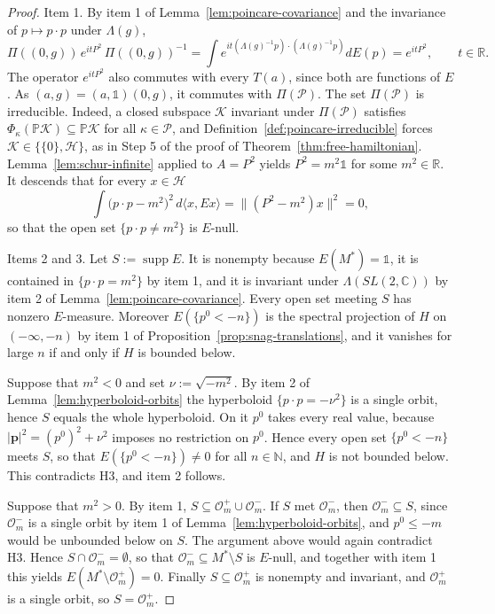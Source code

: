 \begin{proof}
	Item 1. By item 1 of Lemma~\ref{lem:poincare-covariance} and the invariance of $p\mapsto p\cdot p$ under $\Lambda(g)$,
	\begin{equation*}
		\Pi((0,g))\,e^{itP^2}\,\Pi((0,g))^{-1}=\int e^{it(\Lambda(g)^{-1}p)\cdot(\Lambda(g)^{-1}p)}dE(p)=e^{itP^2}, \qquad t\in\mathbb{R}.
	\end{equation*}
	The operator $e^{itP^2}$ also commutes with every $T(a)$, since both are functions of $E$. As $(a,g)=(a,\mathbb{1})(0,g)$, it commutes with $\Pi(\mathcal{P})$. The set $\Pi(\mathcal{P})$ is irreducible. Indeed, a closed subspace $\mathcal{K}$ invariant under $\Pi(\mathcal{P})$ satisfies $\Phi_\kappa(\mathbb{P}\mathcal{K})\subseteq\mathbb{P}\mathcal{K}$ for all $\kappa\in\mathcal{P}$, and Definition~\ref{def:poincare-irreducible} forces $\mathcal{K}\in\{\{0\},\mathcal{H}\}$, as in Step 5 of the proof of Theorem~\ref{thm:free-hamiltonian}. Lemma~\ref{lem:schur-infinite} applied to $A=P^2$ yields $P^2=m^2\mathbb{1}$ for some $m^2\in\mathbb{R}$. It descends that for every $x\in\mathcal{H}$
	\begin{equation*}
		\int\big(p\cdot p-m^2\big)^2\,d\langle x,Ex\rangle=\big\|(P^2-m^2)x\big\|^2=0,
	\end{equation*}
	so that the open set $\{p\cdot p\neq m^2\}$ is $E$-null.
	
	Items 2 and 3. Let $S:=\operatorname{supp}E$. It is nonempty because $E(M^*)=\mathbb{1}$, it is contained in $\{p\cdot p=m^2\}$ by item 1, and it is invariant under $\Lambda(SL(2,\mathbb{C}))$ by item 2 of Lemma~\ref{lem:poincare-covariance}. Every open set meeting $S$ has nonzero $E$-measure. Moreover $E(\{p^0<-n\})$ is the spectral projection of $H$ on $(-\infty,-n)$ by item 1 of Proposition~\ref{prop:snag-translations}, and it vanishes for large $n$ if and only if $H$ is bounded below.
	
	Suppose that $m^2<0$ and set $\nu:=\sqrt{-m^2}$. By item 2 of Lemma~\ref{lem:hyperboloid-orbits} the hyperboloid $\{p\cdot p=-\nu^2\}$ is a single orbit, hence $S$ equals the whole hyperboloid. On it $p^0$ takes every real value, because $|\mathbf{p}|^2=(p^0)^2+\nu^2$ imposes no restriction on $p^0$. Hence every open set $\{p^0<-n\}$ meets $S$, so that $E(\{p^0<-n\})\neq0$ for all $n\in\mathbb{N}$, and $H$ is not bounded below. This contradicts H3, and item 2 follows.
	
	Suppose that $m^2>0$. By item 1, $S\subseteq\mathcal{O}_m^+\cup\mathcal{O}_m^-$. If $S$ met $\mathcal{O}_m^-$, then $\mathcal{O}_m^-\subseteq S$, since $\mathcal{O}_m^-$ is a single orbit by item 1 of Lemma~\ref{lem:hyperboloid-orbits}, and $p^0\leq-m$ would be unbounded below on $S$. The argument above would again contradict H3. Hence $S\cap\mathcal{O}_m^-=\emptyset$, so that $\mathcal{O}_m^-\subseteq M^*\setminus S$ is $E$-null, and together with item 1 this yields $E(M^*\setminus\mathcal{O}_m^+)=0$. Finally $S\subseteq\mathcal{O}_m^+$ is nonempty and invariant, and $\mathcal{O}_m^+$ is a single orbit, so $S=\mathcal{O}_m^+$.
\end{proof}


